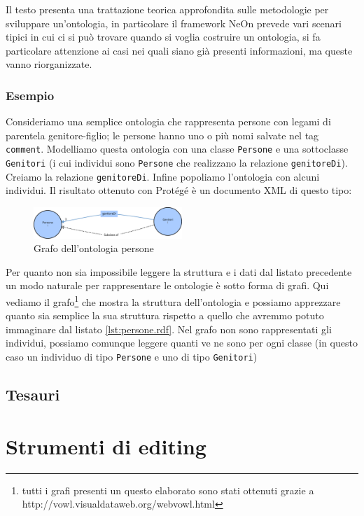  Il testo \cite{suarez2015neon} presenta una trattazione teorica approfondita sulle metodologie per sviluppare un'ontologia, in particolare il framework NeOn prevede vari scenari tipici in cui ci si può trovare quando si voglia costruire un ontologia, si fa particolare attenzione ai casi nei quali siano già presenti informazioni, ma queste vanno riorganizzate.
\subsubsection{Esempio}
Consideriamo una semplice ontologia che rappresenta persone con legami di parentela genitore-figlio; le persone hanno uno o più nomi salvate nel tag \verb|comment|. Modelliamo questa ontologia con una classe \verb|Persone| e una sottoclasse \verb|Genitori| (i cui individui sono \verb|Persone| che realizzano la relazione \verb|genitoreDi|). Creiamo la relazione \verb|genitoreDi|. Infine popoliamo l'ontologia con alcuni individui. Il risultato ottenuto con Protégé è un documento XML di questo tipo:
\vspace{-1cm}
\begin{figure}
	\centering
	\caption{Grafo dell'ontologia persone}
	\includegraphics[width=0.5\textwidth]{Picture/persone.rdf.pdf}
\end{figure}

Per quanto non sia impossibile leggere la struttura e i dati dal listato precedente un modo naturale per rappresentare le ontologie è sotto forma di grafi. Qui vediamo il grafo\footnote{tutti i grafi presenti un questo elaborato sono stati ottenuti grazie a http://vowl.visualdataweb.org/webvowl.html} che mostra la struttura dell'ontologia e possiamo apprezzare quanto sia semplice la sua struttura rispetto a quello che avremmo potuto immaginare dal listato \ref{lst:persone.rdf}. Nel grafo non sono rappresentati gli individui, possiamo comunque leggere quanti ve ne sono per ogni classe (in questo caso un individuo di tipo \verb|Persone| e uno di tipo \verb|Genitori|)


\subsection{Tesauri}

\section{Strumenti di editing}

